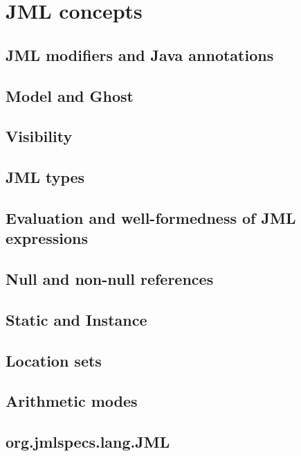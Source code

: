 \chapter{JML concepts}

\section{JML modifiers and Java annotations}

\section{Model and Ghost}

\section{Visibility}

\section{JML types}

\section{Evaluation and well-formedness of JML expressions}

\section{Null and non-null references}

\section{Static and Instance}

\section{Location sets}

\section{Arithmetic modes}

\section{org.jmlspecs.lang.JML}
\label{JMLlang}

